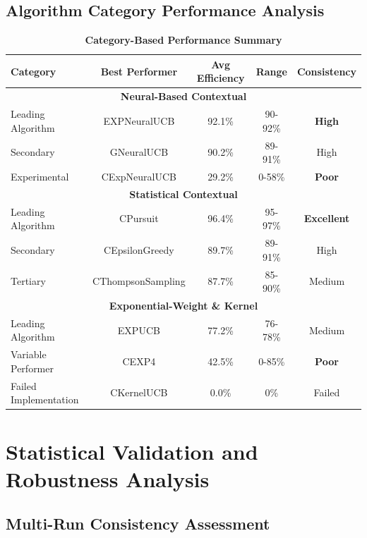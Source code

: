 \documentclass[12pt,a4paper]{article}
\newcommand{\performance}[1]{\textcolor{performancecolor}{\textbf{#1}}}
\newcommand{\critical}[1]{\textcolor{criticalcolor}{\textbf{#1}}}
\newcommand{\success}[1]{\textcolor{successcolor}{\textbf{#1}}}
\begin{document}
\subsection{Algorithm Category Performance Analysis}

\begin{table}[H]
\centering
\caption{\performance{Category-Based Performance Summary}}
\begin{tabular}{|l|c|c|c|c|}
\hline
\textbf{Category} & \textbf{Best Performer} & \textbf{Avg Efficiency} & \textbf{Range} & \textbf{Consistency} \\
\hline
\hline
\multicolumn{5}{|c|}{\textbf{Neural-Based Contextual}} \\
\hline
Leading Algorithm & EXPNeuralUCB & 92.1\% & 90-92\% & \success{High} \\
Secondary & GNeuralUCB & 90.2\% & 89-91\% & High \\
Experimental & CExpNeuralUCB & 29.2\% & 0-58\% & \critical{Poor} \\
\hline
\multicolumn{5}{|c|}{\textbf{Statistical Contextual}} \\
\hline
Leading Algorithm & CPursuit & 96.4\% & 95-97\% & \success{Excellent} \\
Secondary & CEpsilonGreedy & 89.7\% & 89-91\% & High \\
Tertiary & CThompsonSampling & 87.7\% & 85-90\% & Medium \\
\hline
\multicolumn{5}{|c|}{\textbf{Exponential-Weight \& Kernel}} \\
\hline
Leading Algorithm & EXPUCB & 77.2\% & 76-78\% & Medium \\
Variable Performer & CEXP4 & 42.5\% & 0-85\% & \critical{Poor} \\
Failed Implementation & CKernelUCB & 0.0\% & 0\% & Failed \\
\hline
\end{tabular}
\end{table}

\section{Statistical Validation and Robustness Analysis}

\subsection{Multi-Run Consistency Assessment}
\end{document}
